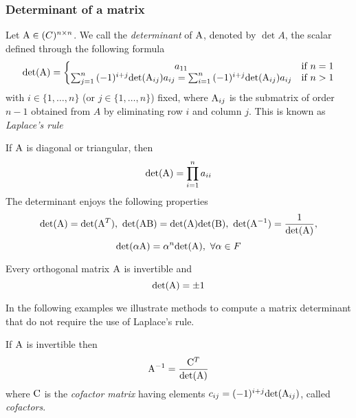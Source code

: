 \subsubsection{Determinant of a matrix}

\begin{definition}
    Let $\mathrm{A} \in \mathbb{(}C)^{n \times n}$. We call the \textit{determinant} of $\mathrm{A}$, denoted by $\det{A}$, the scalar defined through the following formula
    $$
        \mathrm{det}{(\mathrm{A})} = \left\{\begin{matrix}
        a_{11} & \text{if}\ n = 1 \\
        \sum_{j=1}^{n}{(-1)^{i+j}\mathrm{det}{(\mathrm{A}_{ij})}a_{ij}} = \sum_{i=1}^{n}{(-1)^{i+j}\mathrm{det}{(\mathrm{A}_{ij})}a_{ij}} & \text{if}\ n > 1
        \end{matrix}\right.
    $$
    with $i \in \{1, \hdots, n\}$ (or $j \in \{1, \hdots, n\}$) fixed, where $\mathrm{A}_{ij}$ is the submatrix of order $n - 1$ obtained from $A$ by eliminating row $i$ and column $j$. This is known as \textit{Laplace's rule}
\end{definition}

If $\mathrm{A}$ is diagonal or triangular, then
$$\mathrm{det}{(\mathrm{A})} = \prod_{i=1}^{n}{a_{ii}}$$
The determinant enjoys the following properties
$$ \det{(\mat{A})} = \det{(\transp{A})},\ \det{(\mat{AB})} = \det{(\mat{A})}\det{(\mat{B})},\ \det{(\inv{A})} = \frac{1}{\det{(\mat{A})}}, $$
$$ \mathrm{det}{(\alpha\mathrm{A})} = \alpha^{n}\mathrm{det}{(\mathrm{A})},\ \forall \alpha \in F $$

\begin{proposition}
    Every orthogonal matrix $\mathrm{A}$ is invertible and
    $$ \mathrm{det}{(\mathrm{A})} = \pm 1 $$
\end{proposition}

In the following examples we illustrate methods to compute a matrix determinant that do not require the use of Laplace's rule.







\begin{proposition}
    If $\mathrm{A}$ is invertible then
    $$ \mathrm{A}^{-1} = \frac{\mathrm{C}^T}{\mathrm{det}{(\mathrm{A})}} $$
    where $\mathrm{C}$ is the \textit{cofactor matrix} having elements $c_{ij} = (-1)^{i+j}\mathrm{det}{(\mathrm{A}_{ij})}$, called \textit{cofactors}.
\end{proposition}

